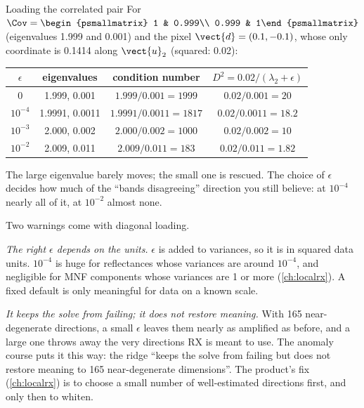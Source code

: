\begin{worked}[label={we:rx:loading}]{Loading the correlated pair}
For $\Cov = \begin{psmallmatrix} 1 & 0.999\\ 0.999 & 1\end{psmallmatrix}$ (eigenvalues 1.999 and
0.001) and the pixel $\vect{d} = (0.1, -0.1)$, whose only coordinate is 0.1414 along $\vect{u}_2$
(squared: 0.02):
\begin{center}
\begin{tabular}{cccc}
\toprule
$\epsilon$ & eigenvalues & condition number & $D^2 = 0.02/(\lambda_2 + \epsilon)$\\
\midrule
0         & 1.999, 0.001   & $1.999/0.001 = 1999$   & $0.02/0.001 = 20$\\
$10^{-4}$ & 1.9991, 0.0011 & $1.9991/0.0011 = 1817$ & $0.02/0.0011 = 18.2$\\
$10^{-3}$ & 2.000, 0.002   & $2.000/0.002 = 1000$   & $0.02/0.002 = 10$\\
$10^{-2}$ & 2.009, 0.011   & $2.009/0.011 = 183$    & $0.02/0.011 = 1.82$\\
\bottomrule
\end{tabular}
\end{center}
The large eigenvalue barely moves; the small one is rescued. The choice of $\epsilon$ decides how
much of the ``bands disagreeing'' direction you still believe: at $10^{-4}$ nearly all of it, at
$10^{-2}$ almost none.
\end{worked}

Two warnings come with diagonal loading.

\emph{The right $\epsilon$ depends on the units.} $\epsilon$ is added to variances, so it is in
squared data units. $10^{-4}$ is huge for reflectances whose variances are around $10^{-4}$, and
negligible for MNF components whose variances are 1 or more (\cref{ch:localrx}). A fixed default is
only meaningful for data on a known scale.

\emph{It keeps the solve from failing; it does not restore meaning.} With 165 near-degenerate
directions, a small $\epsilon$ leaves them nearly as amplified as before, and a large one throws away
the very directions RX is meant to use. The anomaly course puts it this way: the ridge ``keeps the
solve from failing but does not restore meaning to 165 near-degenerate dimensions''. The product's
fix (\cref{ch:localrx}) is to choose a small number of well-estimated directions first, and only
then to whiten.

